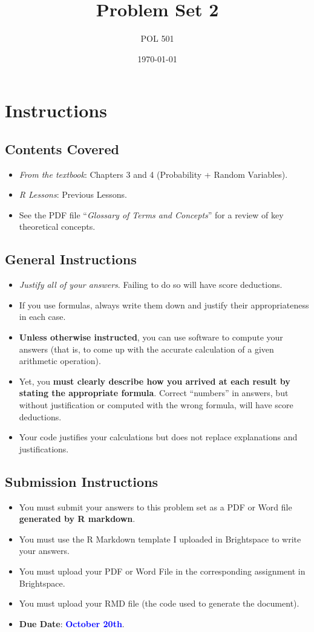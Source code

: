 \documentclass[11pt]{article}
\title{Problem Set 2}
\author{POL 501}
\date{\today}
\begin{document}
\maketitle

\section*{Instructions}
\subsection*{Contents Covered}
\begin{itemize}
    \item \emph{From the textbook}: Chapters 3 and 4 (Probability + Random Variables).
    \item \emph{R Lessons}: Previous Lessons.
    \item See the PDF file ``\emph{Glossary of Terms and Concepts}'' for a review of key theoretical concepts.
\end{itemize}
\subsection*{General Instructions}
\begin{itemize}
    \item \emph{Justify all of your answers}. Failing to do so will have score deductions.
    \item If you use formulas, always write them down and justify their appropriateness in each case.
    \item \textbf{Unless otherwise instructed}, you can use software to compute your answers (that is, to come up with the accurate calculation of a given arithmetic operation). 
    \item Yet, you \textbf{must clearly describe how you arrived at each result by stating the appropriate formula}. Correct ``numbers'' in answers, but without justification or computed with the wrong formula, will have score deductions.
    \item Your code justifies your calculations but does not replace explanations and justifications.
\end{itemize}
\subsection*{Submission Instructions}
\begin{itemize}
    \item You must submit your answers to this problem set as a PDF or Word file \textbf{generated by R markdown}.
    \item You must use the R Markdown template I uploaded in Brightspace to write your answers.
    \item You must upload your PDF or Word File in the corresponding assignment in Brightspace.
    \item You must upload your RMD file (the code used to generate the document). 
    \item \textbf{Due Date}: \textcolor{blue}{\textbf{October 20th}}.
\end{itemize}
\end{document}
